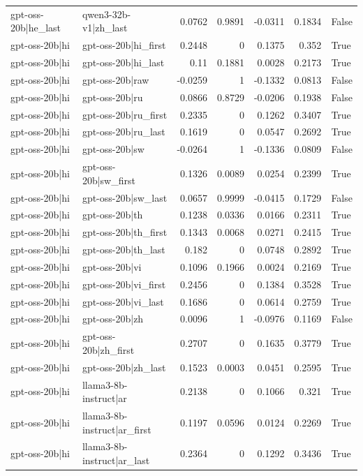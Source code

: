 \begin{table}
\begin{tabular}{l l r r r r l}
gpt-oss-20b|he_last & qwen3-32b-v1|zh_last & 0.0762 & 0.9891 & -0.0311 & 0.1834 & False \\
gpt-oss-20b|hi & gpt-oss-20b|hi_first & 0.2448 & 0 & 0.1375 & 0.352 & True \\
gpt-oss-20b|hi & gpt-oss-20b|hi_last & 0.11 & 0.1881 & 0.0028 & 0.2173 & True \\
gpt-oss-20b|hi & gpt-oss-20b|raw & -0.0259 & 1 & -0.1332 & 0.0813 & False \\
gpt-oss-20b|hi & gpt-oss-20b|ru & 0.0866 & 0.8729 & -0.0206 & 0.1938 & False \\
gpt-oss-20b|hi & gpt-oss-20b|ru_first & 0.2335 & 0 & 0.1262 & 0.3407 & True \\
gpt-oss-20b|hi & gpt-oss-20b|ru_last & 0.1619 & 0 & 0.0547 & 0.2692 & True \\
gpt-oss-20b|hi & gpt-oss-20b|sw & -0.0264 & 1 & -0.1336 & 0.0809 & False \\
gpt-oss-20b|hi & gpt-oss-20b|sw_first & 0.1326 & 0.0089 & 0.0254 & 0.2399 & True \\
gpt-oss-20b|hi & gpt-oss-20b|sw_last & 0.0657 & 0.9999 & -0.0415 & 0.1729 & False \\
gpt-oss-20b|hi & gpt-oss-20b|th & 0.1238 & 0.0336 & 0.0166 & 0.2311 & True \\
gpt-oss-20b|hi & gpt-oss-20b|th_first & 0.1343 & 0.0068 & 0.0271 & 0.2415 & True \\
gpt-oss-20b|hi & gpt-oss-20b|th_last & 0.182 & 0 & 0.0748 & 0.2892 & True \\
gpt-oss-20b|hi & gpt-oss-20b|vi & 0.1096 & 0.1966 & 0.0024 & 0.2169 & True \\
gpt-oss-20b|hi & gpt-oss-20b|vi_first & 0.2456 & 0 & 0.1384 & 0.3528 & True \\
gpt-oss-20b|hi & gpt-oss-20b|vi_last & 0.1686 & 0 & 0.0614 & 0.2759 & True \\
gpt-oss-20b|hi & gpt-oss-20b|zh & 0.0096 & 1 & -0.0976 & 0.1169 & False \\
gpt-oss-20b|hi & gpt-oss-20b|zh_first & 0.2707 & 0 & 0.1635 & 0.3779 & True \\
gpt-oss-20b|hi & gpt-oss-20b|zh_last & 0.1523 & 0.0003 & 0.0451 & 0.2595 & True \\
gpt-oss-20b|hi & llama3-8b-instruct|ar & 0.2138 & 0 & 0.1066 & 0.321 & True \\
gpt-oss-20b|hi & llama3-8b-instruct|ar_first & 0.1197 & 0.0596 & 0.0124 & 0.2269 & True \\
gpt-oss-20b|hi & llama3-8b-instruct|ar_last & 0.2364 & 0 & 0.1292 & 0.3436 & True \\

\end{tabular}
\end{table}

